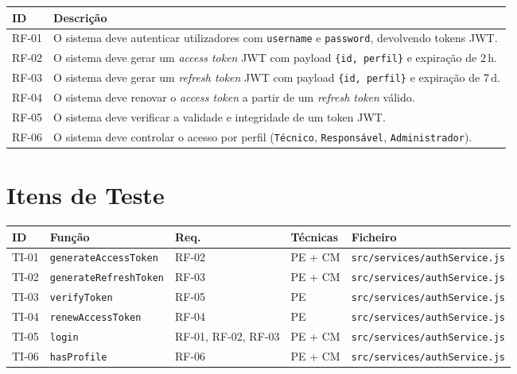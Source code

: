 \documentclass[a4paper,11pt]{article}
\begin{document}
\begin{tabular}{@{}C{1.4cm}L{13cm}@{}}
  \toprule
  \textbf{ID} & \textbf{Descrição} \\
  \midrule
  RF-01 & O sistema deve autenticar utilizadores com \texttt{username} e \texttt{password},
          devolvendo tokens JWT. \\
  RF-02 & O sistema deve gerar um \textit{access token} JWT com payload \texttt{\{id, perfil\}}
          e expiração de 2\,h. \\
  RF-03 & O sistema deve gerar um \textit{refresh token} JWT com payload \texttt{\{id, perfil\}}
          e expiração de 7\,d. \\
  RF-04 & O sistema deve renovar o \textit{access token} a partir de um \textit{refresh token} válido. \\
  RF-05 & O sistema deve verificar a validade e integridade de um token JWT. \\
  RF-06 & O sistema deve controlar o acesso por perfil
          (\texttt{Técnico}, \texttt{Responsável}, \texttt{Administrador}). \\
  \bottomrule
\end{tabular}

\section{Itens de Teste}

\begin{tabular}{@{}C{1.2cm}L{4cm}C{2.5cm}L{3cm}L{5cm}@{}}
  \toprule
  \textbf{ID} & \textbf{Função} & \textbf{Req.} & \textbf{Técnicas} & \textbf{Ficheiro} \\
  \midrule
  TI-01 & \texttt{generateAccessToken}  & RF-02            & PE + CM & \texttt{src/services/authService.js} \\
  TI-02 & \texttt{generateRefreshToken} & RF-03            & PE + CM & \texttt{src/services/authService.js} \\
  TI-03 & \texttt{verifyToken}          & RF-05            & PE      & \texttt{src/services/authService.js} \\
  TI-04 & \texttt{renewAccessToken}     & RF-04            & PE      & \texttt{src/services/authService.js} \\
  TI-05 & \texttt{login}                & RF-01, RF-02, RF-03 & PE + CM & \texttt{src/services/authService.js} \\
  TI-06 & \texttt{hasProfile}           & RF-06            & PE + CM & \texttt{src/services/authService.js} \\
  \bottomrule
\end{tabular}
\end{document}
